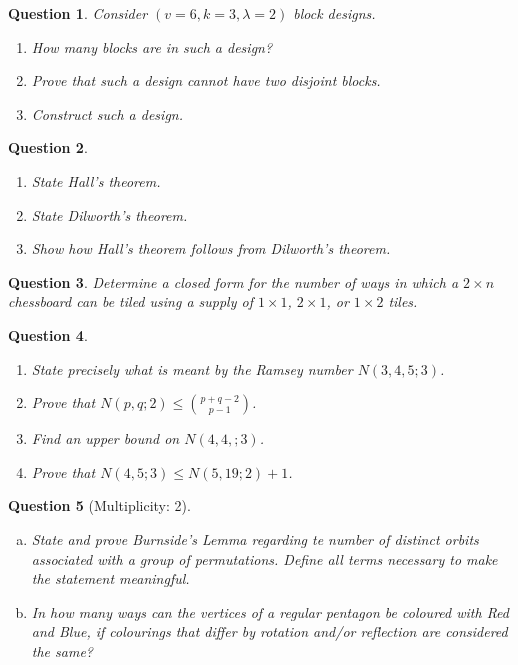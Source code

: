 \documentclass[12]{article}
\newtheorem{question}{Question}
\theoremstyle{definition}
\begin{document}
	\begin{question}
		Consider $(v=6,k=3,\lambda=2)$ block designs.
		\begin{enumerate}
			\item How many blocks are in such a design?
			\item Prove that such a design cannot have two disjoint blocks.
			\item Construct such a design.
		\end{enumerate}
	\end{question}

	\begin{question}
		\
		\begin{enumerate}
			\item State Hall's theorem.
			\item State Dilworth's theorem.
			\item Show how Hall's theorem follows from Dilworth's theorem.
		\end{enumerate}
	\end{question}

	\begin{question}
		Determine a closed form for the number of ways in which a $2 \times n$ chessboard can be tiled using a supply of $1 \times 1$, $2 \times 1$, or $1 \times 2$ tiles.
	\end{question}

	\begin{question}
		\
		\begin{enumerate}
			\item State precisely what is meant by the Ramsey number $N(3,4,5;3)$.
			\item Prove that $N(p,q;2) \leq {p + q - 2 \choose p-1}$.
			\item Find an upper bound on $N(4,4,;3)$.
			\item Prove that $N(4,5;3) \leq N(5,19;2)+1$.
		\end{enumerate}
	\end{question}

	\begin{question}[Multiplicity: 2]
		\
		\begin{enumerate}[a)]
			\item State and prove Burnside's Lemma regarding te number of distinct orbits associated with a group of permutations.  Define all terms necessary to make the statement meaningful.
			\item In how many ways can the vertices of a regular pentagon be coloured with Red and Blue, if colourings that differ by rotation and/or reflection are considered the same?
		\end{enumerate}
	\end{question}
\end{document}
